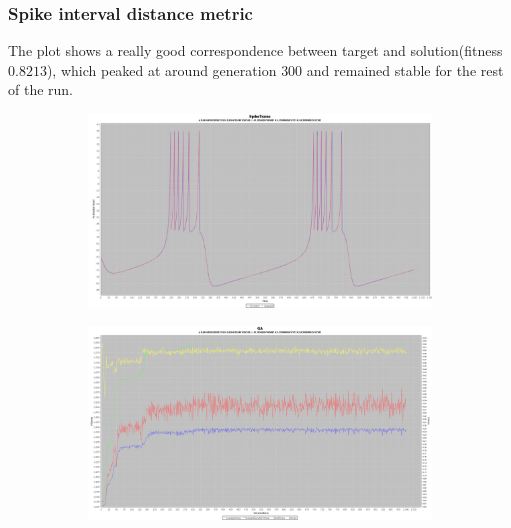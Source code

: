 \documentclass[10pt]{article}
\begin{document}
		\subsubsection{Spike interval distance metric}
			The plot shows a really good correspondence between target and solution(fitness $0.8213$), which peaked at around generation $300$ and remained stable for the rest of the run.
			\begin{figure}[H]
				\centering
					\begin{subfigure}{.5\textwidth}
						\centering
						\includegraphics[width=\linewidth]{./../images/izzy3/interval/plot.png}
						
						\label{fig:sub8a}
					\end{subfigure}%
					\begin{subfigure}{.5\textwidth}
						\centering
						\includegraphics[width=\linewidth]{./../images/izzy3/interval/prog.png}
						
						\label{fig:sub8b}
					\end{subfigure}
					
					\label{fig:test}
			\end{figure}
			
\end{document}
